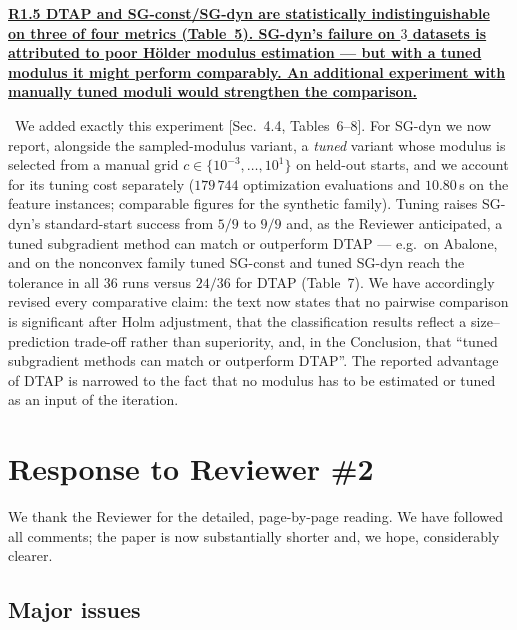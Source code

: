 \documentclass[11pt]{article}
\newcommand{\response}[1]{\smallskip\noindent{\color{blue!60!black}\textbf{Response.}}\ #1\par\medskip}
\newcommand{\loc}[1]{\textcolor{blue!50!black}{[#1]}}
\newenvironment{point}[1]{\medskip\noindent\textbf{\uline{#1}}\par}{\par}
\begin{document}
\begin{point}{R1.5 DTAP and SG-const/SG-dyn are statistically indistinguishable on three
of four metrics (Table~5). SG-dyn's failure on $3$ datasets is attributed to poor
H\"older modulus estimation --- but with a tuned modulus it might perform comparably. An
additional experiment with manually tuned moduli would strengthen the comparison.}
\response{We added exactly this experiment \loc{Sec.~4.4, Tables~6--8}. For SG-dyn we now
report, alongside the sampled-modulus variant, a \emph{tuned} variant whose modulus is
selected from a manual grid $c\in\{10^{-3},\dots,10^{1}\}$ on held-out starts, and we
account for its tuning cost separately ($179\,744$ optimization evaluations and
$10.80$\,s on the feature instances; comparable figures for the synthetic family). Tuning
raises SG-dyn's standard-start success from $5/9$ to $9/9$ and, as the Reviewer
anticipated, a tuned subgradient method can match or outperform DTAP --- e.g.\ on Abalone,
and on the nonconvex family tuned SG-const and tuned SG-dyn reach the tolerance in all
$36$ runs versus $24/36$ for DTAP (Table~7). We have accordingly revised every comparative
claim: the text now states that no pairwise comparison is significant after Holm
adjustment, that the classification results reflect a size--prediction trade-off rather
than superiority, and, in the Conclusion, that ``tuned subgradient methods can match or outperform
DTAP''. The
reported advantage of DTAP is narrowed to the fact that no modulus has to be estimated or
tuned as an input of the iteration.}
\end{point}

\section*{Response to Reviewer \#2}

\noindent We thank the Reviewer for the detailed, page-by-page reading. We have followed
all comments; the paper is now substantially shorter and, we hope, considerably clearer.

\subsection*{Major issues}
\end{document}

